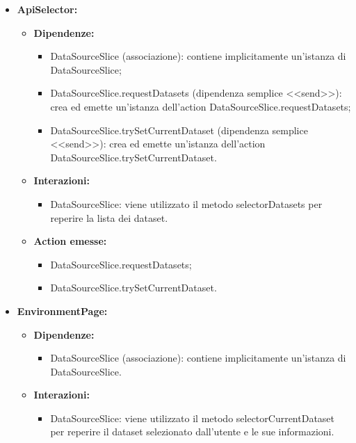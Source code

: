 \begin{itemize}
      \item \textbf{ApiSelector:}
            \begin{itemize}
                  \item \textbf{Dipendenze:}
                        \begin{itemize}
                              \item DataSourceSlice (associazione): contiene implicitamente un'istanza di
                                    DataSourceSlice;
                              \item DataSourceSlice.requestDatasets (dipendenza semplice <<send>>): crea ed emette
                                    un'istanza dell'action DataSourceSlice.requestDatasets;
                              \item DataSourceSlice.trySetCurrentDataset (dipendenza semplice <<send>>): crea ed
                                    emette un'istanza dell'action DataSourceSlice.trySetCurrentDataset.
                        \end{itemize}
                  \item \textbf{Interazioni:}
                        \begin{itemize}
                              \item DataSourceSlice: viene utilizzato il metodo selectorDatasets per reperire la
                                    lista dei dataset.
                        \end{itemize}
                  \item \textbf{Action emesse:}
                        \begin{itemize}
                              \item DataSourceSlice.requestDatasets;
                              \item DataSourceSlice.trySetCurrentDataset.
                        \end{itemize}
            \end{itemize}

      \item \textbf{EnvironmentPage:}
            \begin{itemize}
                  \item \textbf{Dipendenze:}
                        \begin{itemize}
                              \item DataSourceSlice (associazione): contiene implicitamente un'istanza di
                                    DataSourceSlice.
                        \end{itemize}
                  \item \textbf{Interazioni:}
                        \begin{itemize}
                              \item DataSourceSlice: viene utilizzato il metodo selectorCurrentDataset per reperire
                                    il dataset selezionato dall'utente e le sue informazioni.
                        \end{itemize}
            \end{itemize}
\end{itemize}

